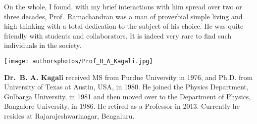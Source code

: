 On the whole, I found, with my brief interactions with him spread over two or three decades, Prof.\ Ramachandran was a man of proverbial simple living and high thinking with a total dedication to the subject of his choice. He was quite friendly with students and collaborators. It is indeed very rare to find such individuals in the society.
\bigskip

\centerline{\texttt{[image: authorsphotos/Prof\_B\_A\_Kagali.jpg]}}
\bigskip

\noindent
\textbf{Dr.\ B. A. Kagali} received MS from Purdue University in 1976, and Ph.D. from University of Texas at Austin, USA, in 1980. He joined the Physics Department, Gulbarga University, in 1981 and then moved over to the Department of Physics, Bangalore University, in 1986. He retired as a Professor in 2013. Currently he resides at Rajarajeshwarinagar, Bengaluru.
